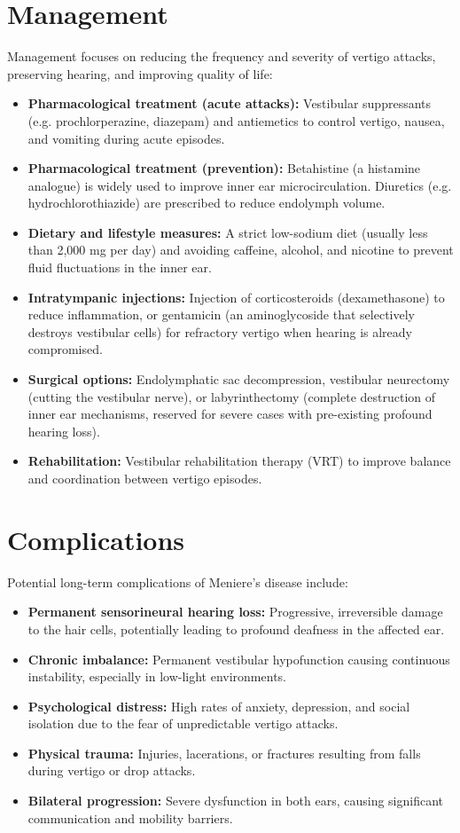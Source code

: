 \section*{Management}
Management focuses on reducing the frequency and severity of vertigo attacks, preserving hearing, and improving quality of life:
\begin{itemize}
    \item \textbf{Pharmacological treatment (acute attacks):} Vestibular suppressants (e.g. prochlorperazine, diazepam) and antiemetics to control vertigo, nausea, and vomiting during acute episodes.
    \item \textbf{Pharmacological treatment (prevention):} Betahistine (a histamine analogue) is widely used to improve inner ear microcirculation. Diuretics (e.g. hydrochlorothiazide) are prescribed to reduce endolymph volume.
    \item \textbf{Dietary and lifestyle measures:} A strict low-sodium diet (usually less than 2,000 mg per day) and avoiding caffeine, alcohol, and nicotine to prevent fluid fluctuations in the inner ear.
    \item \textbf{Intratympanic injections:} Injection of corticosteroids (dexamethasone) to reduce inflammation, or gentamicin (an aminoglycoside that selectively destroys vestibular cells) for refractory vertigo when hearing is already compromised.
    \item \textbf{Surgical options:} Endolymphatic sac decompression, vestibular neurectomy (cutting the vestibular nerve), or labyrinthectomy (complete destruction of inner ear mechanisms, reserved for severe cases with pre-existing profound hearing loss).
    \item \textbf{Rehabilitation:} Vestibular rehabilitation therapy (VRT) to improve balance and coordination between vertigo episodes.
\end{itemize}

\section*{Complications}
Potential long-term complications of Meniere's disease include:
\begin{itemize}
    \item \textbf{Permanent sensorineural hearing loss:} Progressive, irreversible damage to the hair cells, potentially leading to profound deafness in the affected ear.
    \item \textbf{Chronic imbalance:} Permanent vestibular hypofunction causing continuous instability, especially in low-light environments.
    \item \textbf{Psychological distress:} High rates of anxiety, depression, and social isolation due to the fear of unpredictable vertigo attacks.
    \item \textbf{Physical trauma:} Injuries, lacerations, or fractures resulting from falls during vertigo or drop attacks.
    \item \textbf{Bilateral progression:} Severe dysfunction in both ears, causing significant communication and mobility barriers.
\end{itemize}

